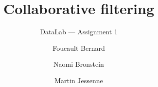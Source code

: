 \documentclass[aspectratio=169,11pt]{beamer}
\title{Collaborative filtering}
\subtitle{DataLab --- Assignment 1}
\author{Foucault Bernard \and Naomi Bronstein \and Martin Jessenne}
\institute{Group 21}
\date{}
\begin{document}
\begin{frame}
  \titlepage
\end{frame}





\end{document}
